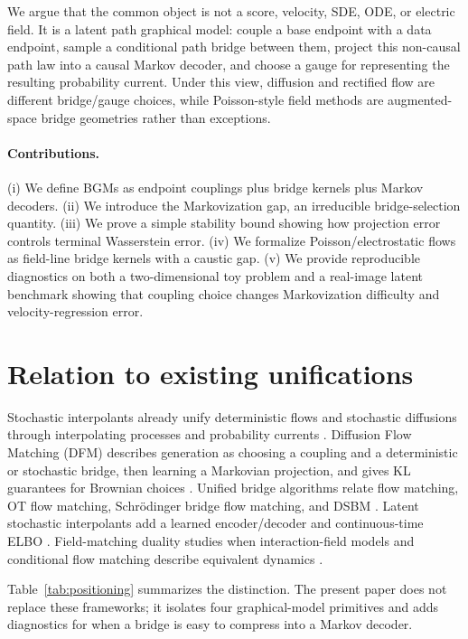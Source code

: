 \documentclass{article}
\numberwithin{equation}{section}
\begin{document}
We argue that the common object is not a score, velocity, SDE, ODE, or electric field. It is a latent path graphical model: couple a base endpoint with a data endpoint, sample a conditional path bridge between them, project this non-causal path law into a causal Markov decoder, and choose a gauge for representing the resulting probability current. Under this view, diffusion and rectified flow are different bridge/gauge choices, while Poisson-style field methods are augmented-space bridge geometries rather than exceptions.

\paragraph{Contributions.} (i) We define BGMs as endpoint couplings plus bridge kernels plus Markov decoders. (ii) We introduce the Markovization gap, an irreducible bridge-selection quantity. (iii) We prove a simple stability bound showing how projection error controls terminal Wasserstein error. (iv) We formalize Poisson/electrostatic flows as field-line bridge kernels with a caustic gap. (v) We provide reproducible diagnostics on both a two-dimensional toy problem and a real-image latent benchmark showing that coupling choice changes Markovization difficulty and velocity-regression error.

\section{Relation to existing unifications}
\label{sec:related}

Stochastic interpolants already unify deterministic flows and stochastic diffusions through interpolating processes and probability currents \citep{albergo2023flows,albergo2023stochastic}. Diffusion Flow Matching (DFM) describes generation as choosing a coupling and a deterministic or stochastic bridge, then learning a Markovian projection, and gives KL guarantees for Brownian choices \citep{silveri2024dfm}. Unified bridge algorithms relate flow matching, OT flow matching, Schr\"odinger bridge flow matching, and DSBM \citep{kim2025unified}. Latent stochastic interpolants add a learned encoder/decoder and continuous-time ELBO \citep{singh2025lsi}. Field-matching duality studies when interaction-field models and conditional flow matching describe equivalent dynamics \citep{shlenskii2026duality}.

Table~\ref{tab:positioning} summarizes the distinction. The present paper does not replace these frameworks; it isolates four graphical-model primitives and adds diagnostics for when a bridge is easy to compress into a Markov decoder.
\end{document}
